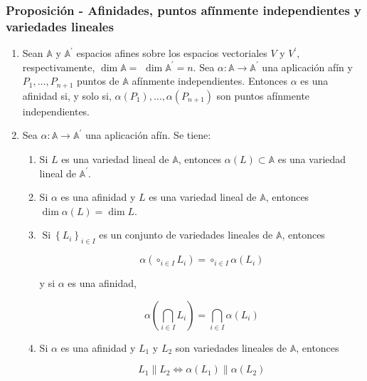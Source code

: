 \documentclass[12pt, a4paper, ones, notitlepage, openany,titlepage]{article}
\begin{document}
\subsubsection{Proposición - Afinidades, puntos afínmente independientes y variedades lineales}
\begin{enumerate}[label=(\arabic*)]
	\item Sean $\mathbb{A}$ y $\mathbb{A}^{\prime}$ espacios afines sobre los espacios vectoriales $V$ y $V^{\prime}$, respectivamente, $\dim  \mathbb{A}=$ $\dim  \mathbb{A}^{\prime}=n$. Sea $\alpha: \mathbb{A} \rightarrow \mathbb{A}^{\prime}$ una aplicación afín y $P_{1}, \ldots, P_{n+1}$ puntos de $\mathbb{A}$ afínmente independientes. Entonces $\alpha$ es una afinidad si, y solo si, $\alpha\left(P_{1}\right), \ldots, \alpha\left(P_{n+1}\right)$ son puntos afínmente independientes.
	
	\item Sea $\alpha: \mathbb{A} \rightarrow \mathbb{A}^{\prime}$ una aplicación afín. Se tiene:
	\begin{enumerate}[label=(\alph*)]
		\item Si $L$ es una variedad lineal de $\mathbb{A}$, entonces $\alpha(L)\subset\mathbb{A}$ es una variedad lineal de $\mathbb{A}^{\prime}$.
		
		\item Si $\alpha$ es una afinidad y $L$ es una variedad lineal de $\mathbb{A}$, entonces $\dim  \alpha(L)=\dim  L$.
		
		\item $\operatorname{Si}\left\{L_{i}\right\}_{i \in I}$ es un conjunto de variedades lineales de $\mathbb{A}$, entonces
		
		$$
		\alpha\left(\circ_{i \in I} L_{i}\right)=\circ_{i \in I} \alpha\left(L_{i}\right)
		$$
		
		\noindent y si $\alpha$ es una afinidad,
		
		$$
		\alpha\left(\bigcap_{i \in I} L_{i}\right)=\bigcap_{i \in I} \alpha\left(L_{i}\right)
		$$
		
		\item Si $\alpha$ es una afinidad y $L_{1}$ y $L_{2}$ son variedades lineales de $\mathbb{A}$, entonces
		
		$$
		L_{1}\left\|L_{2} \Longleftrightarrow \alpha\left(L_{1}\right)\right\| \alpha\left(L_{2}\right)
		$$
	\end{enumerate}
\end{enumerate}
\end{document}
